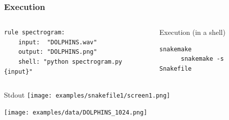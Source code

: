 \documentclass{beamer}
\begin{document}

\begin{frame}[fragile]
\frametitle{Execution}
\begin{columns}[T]
\begin{column}[T]{5.3cm}
  \begin{block}{}
            \begin{lstlisting}
rule spectrogram:
    input:  "DOLPHINS.wav"
    output: "DOLPHINS.png"
    shell: "python spectrogram.py {input}"
    \end{lstlisting}
  \end{block}
\end{column}

\begin{column}{5.8cm}
      \begin{block}{Execution (in a shell)}
	  \begin{lstlisting}[basicstyle=\large]
	  snakemake
	  snakemake -s Snakefile
	  \end{lstlisting}
      \end{block}
      \end{column}
 \end{columns}
    \begin{block}{Stdout}
    \centering
    \texttt{[image: examples/snakefile1/screen1.png]}
    \end{block}     
\end{frame}

\begin{frame}    
    \centering
    \texttt{[image: examples/data/DOLPHINS\_1024.png]}
\end{frame}


                
\end{document}

